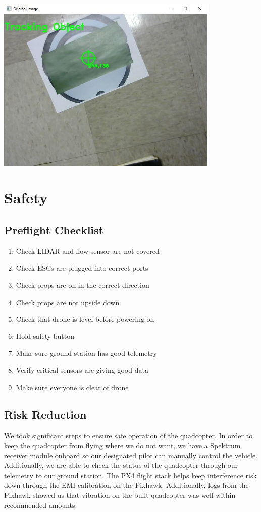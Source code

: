 \documentclass[12pt]{article}
\begin{document}
\begin{center}
\includegraphics[width=0.8\textwidth]{tracking}
\end{center}

\section{Safety}
\subsection{Preflight Checklist}
\begin{enumerate}
	\item Check LIDAR and flow sensor are not covered 
	\item Check ESCs are plugged into correct ports 
	\item Check props are on in the correct direction 
	\item Check props are not upside down
	\item Check that drone is level before powering on
	\item Hold safety button
	\item Make sure ground station has good telemetry
	\item Verify critical sensors are giving good data
	\item Make sure everyone is clear of drone 
\end{enumerate}


\subsection{Risk Reduction}
We took significant steps to ensure safe operation of the quadcopter. In order to keep the quadcopter from flying where we do not want, we have a Spektrum receiver module onboard so our designated pilot can manually control the vehicle. Additionally, we are able to check the status of the quadcopter through our telemetry to our ground station. The PX4 flight stack helps keep interference risk down through the EMI calibration on the Pixhawk. Additionally, logs from the Pixhawk showed us that vibration on the built quadcopter was well within recommended amounts. 
\end{document}
